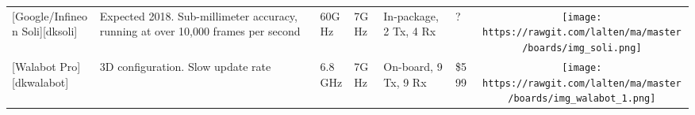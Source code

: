 \begin{longtable}[]{@{}llllllc@{}}
\begin{minipage}[t]{0.09\columnwidth}\raggedright\strut
{[}Google/Infineon Soli{]}{[}dksoli{]}\strut
\end{minipage} & \begin{minipage}[t]{0.13\columnwidth}\raggedright\strut
Expected 2018. Sub-millimeter accuracy, running at over 10,000 frames
per second \cite{Lien2016}\strut
\end{minipage} & \begin{minipage}[t]{0.09\columnwidth}\raggedright\strut
60GHz\strut
\end{minipage} & \begin{minipage}[t]{0.11\columnwidth}\raggedright\strut
7GHz\strut
\end{minipage} & \begin{minipage}[t]{0.10\columnwidth}\raggedright\strut
In-package, 2 Tx, 4 Rx\strut
\end{minipage} & \begin{minipage}[t]{0.15\columnwidth}\raggedright\strut
?\strut
\end{minipage} & \begin{minipage}[t]{0.10\columnwidth}\centering\strut
\texttt{[image: https://rawgit.com/lalten/ma/master/boards/img\_soli.png]}\strut
\end{minipage}\tabularnewline
\begin{minipage}[t]{0.09\columnwidth}\raggedright\strut
{[}Walabot Pro{]}{[}dkwalabot{]}\strut
\end{minipage} & \begin{minipage}[t]{0.13\columnwidth}\raggedright\strut
3D configuration. Slow update rate\strut
\end{minipage} & \begin{minipage}[t]{0.09\columnwidth}\raggedright\strut
6.8GHz\strut
\end{minipage} & \begin{minipage}[t]{0.11\columnwidth}\raggedright\strut
7GHz\strut
\end{minipage} & \begin{minipage}[t]{0.10\columnwidth}\raggedright\strut
On-board, 9 Tx, 9 Rx\strut
\end{minipage} & \begin{minipage}[t]{0.15\columnwidth}\raggedright\strut
\$599\strut
\end{minipage} & \begin{minipage}[t]{0.10\columnwidth}\centering\strut
\texttt{[image: https://rawgit.com/lalten/ma/master/boards/img\_walabot\_1.png]}\strut

\end{minipage}
\end{longtable}

